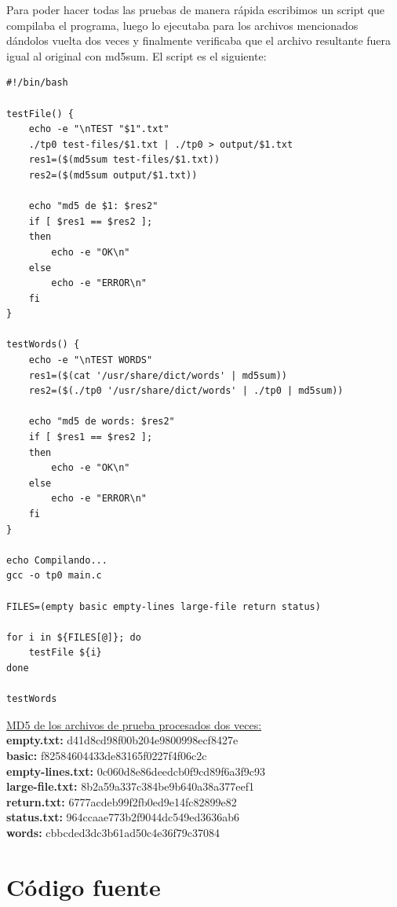 \documentclass[a4paper,11pt]{article}
\begin{document}
Para poder hacer todas las pruebas de manera r\'apida escribimos un script que compilaba el programa, luego lo ejecutaba para los archivos mencionados d\'andolos vuelta dos veces y finalmente verificaba que el archivo resultante fuera igual al original con md5sum. El script es el siguiente:
\lstset{language=bash, breaklines=true, basicstyle=\normalsize}
\begin{lstlisting}
#!/bin/bash

testFile() {
	echo -e "\nTEST "$1".txt"
	./tp0 test-files/$1.txt | ./tp0 > output/$1.txt
	res1=($(md5sum test-files/$1.txt))
	res2=($(md5sum output/$1.txt))
	
	echo "md5 de $1: $res2"
	if [ $res1 == $res2 ]; 
	then
		echo -e "OK\n"
	else
		echo -e "ERROR\n"
	fi
}

testWords() {
	echo -e "\nTEST WORDS"
	res1=($(cat '/usr/share/dict/words' | md5sum))
	res2=($(./tp0 '/usr/share/dict/words' | ./tp0 | md5sum))
	
	echo "md5 de words: $res2"
	if [ $res1 == $res2 ]; 
	then
		echo -e "OK\n"
	else
		echo -e "ERROR\n"
	fi
}

echo Compilando...
gcc -o tp0 main.c

FILES=(empty basic empty-lines large-file return status)

for i in ${FILES[@]}; do
	testFile ${i}
done

testWords
\end{lstlisting}
\underline{MD5 de los archivos de prueba procesados dos veces:}\\
\textbf{empty.txt:} d41d8cd98f00b204e9800998ecf8427e\\
\textbf{basic:} f82584604433de83165f0227f4f06c2c\\
\textbf{empty-lines.txt:} 0c060d8e86deedcb0f9cd89f6a3f9c93\\
\textbf{large-file.txt:} 8b2a59a337c384be9b640a38a377eef1\\
\textbf{return.txt:} 6777acdeb99f2fb0ed9e14fc82899e82\\
\textbf{status.txt:} 964ccaae773b2f9044dc549ed3636ab6\\
\textbf{words:} cbbcded3dc3b61ad50c4e36f79c37084

\section{C\'odigo fuente}
\end{document}
